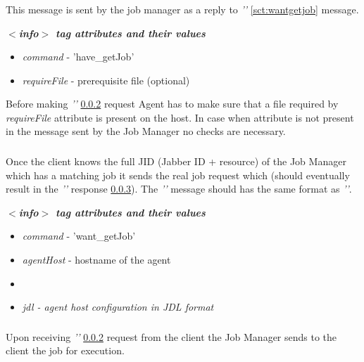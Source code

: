 \subsubsection{}
\label{sct:havegetjob}
This message is sent by the job manager as a reply to \emph{''} \ref{sct:wantgetjob} message.

\emph{\bf $<$info$>$ tag attributes and their values}
\begin{itemize}
  \item \emph{command} - 'have\_getJob'
  \item \emph{requireFile} - prerequisite file (optional)
 \end{itemize}

Before making \emph{''} \ref{sct:getjob} request Agent has to make sure that a file required by \emph{requireFile} attribute is present on the host.
In case when attribute is not present in the message sent by the Job Manager no checks are necessary.

\subsubsection{}
\label{sct:getjob}
Once the client knows the full JID (Jabber ID + resource) of the Job Manager which has a matching job it sends the real job request which (should eventually result in the  \emph{''} response \ref{sct:runjob}). The   \emph{''}  message should has the same format as \emph{''}.

\emph{\bf $<$info$>$ tag attributes and their values}
\begin{itemize}
  \item \emph{command} - 'want\_getJob'
  \item \emph{agentHost} - hostname of the agent
  \item {}
  \item \emph{jdl - agent host configuration in JDL format}
\end{itemize}


\subsubsection{}
\label{sct:runjob}

Upon receiving \emph{''} \ref{sct:getjob} request from the client the Job Manager sends to the client the job for execution.

